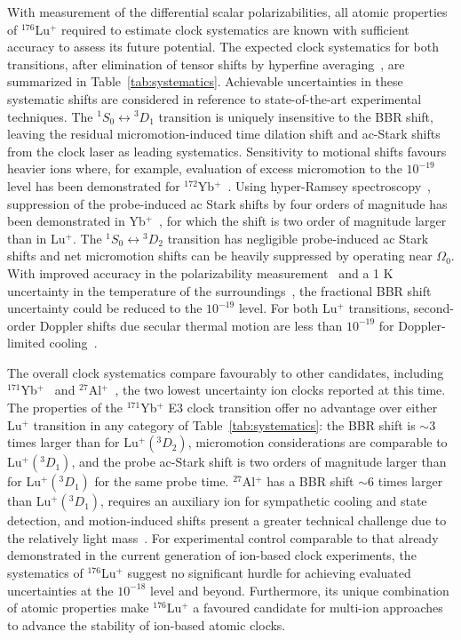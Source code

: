 \documentclass[pra,aps,showpacs,floatfix,twocolumn,nofootinbib,citeautoscript]{revtex4-1}
\newcommand{\tref}[1]{Table~\ref{#1}}
\begin{document}
With measurement of the differential scalar polarizabilities, all atomic properties of $^{176}$Lu$^+$ required to estimate clock systematics are known with sufficient accuracy to assess its future potential.  The expected clock systematics for both transitions, after elimination of tensor shifts by hyperfine averaging~\cite{MDB1}, are summarized in \tref{tab:systematics}.  Achievable uncertainties in these systematic shifts are considered in reference to state-of-the-art experimental techniques. The $^1S_0\leftrightarrow{^3}D_1$ transition is uniquely insensitive to the BBR shift, leaving the residual micromotion-induced time dilation shift and ac-Stark shifts from the clock laser as leading systematics. Sensitivity to motional shifts favours heavier ions where, for example, evaluation of excess micromotion to the $10^{-19}$ level has been demonstrated for $^{172}$Yb$^+$~\cite{keller2016evaluation}.  Using hyper-Ramsey spectroscopy~\cite{hyperRamsey2010}, suppression of the probe-induced ac Stark shifts by four orders of magnitude has been demonstrated in Yb$^+$~\cite{hyperRamsey2012peik}, for which the shift is two order of magnitude larger than in Lu$^+$. The $^1S_0\leftrightarrow{^3}D_2$ transition has negligible probe-induced ac Stark shifts and net micromotion shifts can be heavily suppressed by operating near $\Omega_0$. With improved accuracy in the polarizability measurement~\cite{dube2014high} and a 1 K uncertainty in the temperature of the surroundings~\cite{YbPeik}, the fractional BBR shift uncertainty could be reduced to the $10^{-19}$ level. For both Lu$^+$ transitions, second-order Doppler shifts due secular thermal motion are less than $10^{-19}$ for Doppler-limited cooling~\cite{MDB2}. 

The overall clock systematics compare favourably to other candidates, including $^{171}$Yb$^{+}$~\cite{YbPeik} and $^{27}$Al$^{+}$~\cite{AlIon}, the two lowest uncertainty ion clocks reported at this time. The properties of the $^{171}$Yb$^{+}$ E3 clock transition offer no advantage over either Lu$^+$ transition in any category of \tref{tab:systematics}: the BBR shift is $\sim3$ times larger than for Lu${^+}(^3D_2)$, micromotion considerations are comparable to Lu${^+}(^3D_1)$, and the probe ac-Stark shift is two orders of magnitude larger than for Lu${^+}(^3D_1)$ for the same probe time.  $^{27}$Al$^{+}$ has a BBR shift $\sim$6 times larger~\cite{AlIon} than Lu${^+}(^3D_1)$, requires an auxiliary ion for sympathetic cooling and state detection, and motion-induced shifts present a greater technical challenge due to the relatively light mass~\cite{chen2017sympathetic}. For experimental control comparable to that already demonstrated in the current generation of ion-based clock experiments, the systematics of $^{176}$Lu$^+$ suggest no significant hurdle for achieving evaluated uncertainties at the $10^{-18}$ level and beyond.  Furthermore, its unique combination of atomic properties make $^{176}$Lu$^+$ a favoured candidate for multi-ion approaches~\cite{keller2016evaluation,MDB2} to advance the stability of ion-based atomic clocks.  \\
\end{document}
